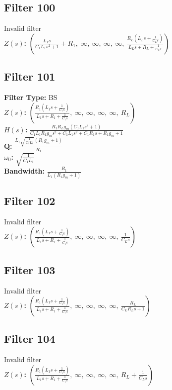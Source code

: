 \documentclass{article}
\begin{document}
\subsection*{Filter 100}
Invalid filter \\ 
\textbf{$Z(s)$:} $\left( \frac{L_{1} s}{C_{1} L_{1} s^{2} + 1} + R_{1}, \  \infty, \  \infty, \  \infty, \  \infty, \  \frac{R_{L} \left(L_{L} s + \frac{1}{C_{L} s}\right)}{L_{L} s + R_{L} + \frac{1}{C_{L} s}}\right)$ \\ 
\subsection*{Filter 101}
\textbf{Filter Type:} BS \\ 
\textbf{$Z(s)$:} $\left( \frac{R_{1} \left(L_{1} s + \frac{1}{C_{1} s}\right)}{L_{1} s + R_{1} + \frac{1}{C_{1} s}}, \  \infty, \  \infty, \  \infty, \  \infty, \  R_{L}\right)$ \\ 
\textbf{$H(s)$:} $\frac{R_{1} R_{L} g_{m} \left(C_{1} L_{1} s^{2} + 1\right)}{C_{1} L_{1} R_{1} g_{m} s^{2} + C_{1} L_{1} s^{2} + C_{1} R_{1} s + R_{1} g_{m} + 1}$ \\ 
\textbf{Q:} $\frac{L_{1} \sqrt{\frac{1}{C_{1} L_{1}}} \left(R_{1} g_{m} + 1\right)}{R_{1}}$ \\ 
\textbf{$\omega_0$:} $\sqrt{\frac{1}{C_{1} L_{1}}}$ \\ 
\textbf{Bandwidth:} $\frac{R_{1}}{L_{1} \left(R_{1} g_{m} + 1\right)}$ \\ 
\subsection*{Filter 102}
Invalid filter \\ 
\textbf{$Z(s)$:} $\left( \frac{R_{1} \left(L_{1} s + \frac{1}{C_{1} s}\right)}{L_{1} s + R_{1} + \frac{1}{C_{1} s}}, \  \infty, \  \infty, \  \infty, \  \infty, \  \frac{1}{C_{L} s}\right)$ \\ 
\subsection*{Filter 103}
Invalid filter \\ 
\textbf{$Z(s)$:} $\left( \frac{R_{1} \left(L_{1} s + \frac{1}{C_{1} s}\right)}{L_{1} s + R_{1} + \frac{1}{C_{1} s}}, \  \infty, \  \infty, \  \infty, \  \infty, \  \frac{R_{L}}{C_{L} R_{L} s + 1}\right)$ \\ 
\subsection*{Filter 104}
Invalid filter \\ 
\textbf{$Z(s)$:} $\left( \frac{R_{1} \left(L_{1} s + \frac{1}{C_{1} s}\right)}{L_{1} s + R_{1} + \frac{1}{C_{1} s}}, \  \infty, \  \infty, \  \infty, \  \infty, \  R_{L} + \frac{1}{C_{L} s}\right)$ \\ 
\end{document}
